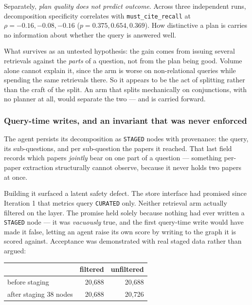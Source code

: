 Separately, \emph{plan quality does not predict outcome}. Across three
independent runs, decomposition specificity correlates with
\texttt{must\_cite\_recall} at $\rho = -0.16, -0.08, -0.16$
($p = 0.375, 0.654, 0.369$). How distinctive a plan is carries no information
about whether the query is answered well.

What survives as an untested hypothesis: the gain comes from issuing several
retrievals against the \emph{parts} of a question, not from the plan being
good. Volume alone cannot explain it, since the arm is worse on
non-relational queries while spending the same retrievals there. So it
appears to be the act of splitting rather than the craft of the split. An arm
that splits mechanically on conjunctions, with no planner at all, would
separate the two --- and is carried forward.

\subsubsection*{Query-time writes, and an invariant that was never enforced}

The agent persists its decomposition as \texttt{STAGED} nodes with
provenance: the query, its sub-questions, and per sub-question the papers it
reached. That last field records which papers \emph{jointly} bear on one part
of a question --- something per-paper extraction structurally cannot observe,
because it never holds two papers at once.

Building it surfaced a latent safety defect. The store interface had promised
since Iteration 1 that metrics query \texttt{CURATED} only. Neither retrieval
arm actually filtered on the layer. The promise held solely because nothing
had ever written a \texttt{STAGED} node --- it was \emph{vacuously} true, and
the first query-time write would have made it false, letting an agent raise
its own score by writing to the graph it is scored against. Acceptance was
demonstrated with real staged data rather than argued:

\begin{center}
\begin{tabular}{lrr}
\hline
 & filtered & unfiltered \\
\hline
before staging & 20{,}688 & 20{,}688 \\
after staging 38 nodes & 20{,}688 & 20{,}726 \\
\hline
\end{tabular}
\end{center}

